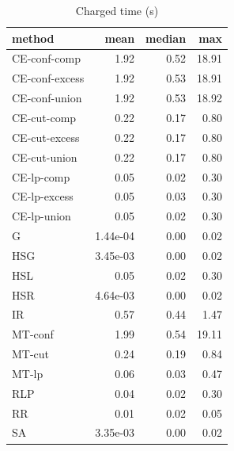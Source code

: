 \begin{table}[htbp]
\centering
\small
\caption{Charged time (s)}
\label{tab:E2_head_to_head_time}
\begin{tabular}{lrrr}
\toprule
method & mean & median & max \\
\midrule
CE-conf-comp & 1.92 & 0.52 & 18.91 \\
CE-conf-excess & 1.92 & 0.53 & 18.91 \\
CE-conf-union & 1.92 & 0.53 & 18.92 \\
CE-cut-comp & 0.22 & 0.17 & 0.80 \\
CE-cut-excess & 0.22 & 0.17 & 0.80 \\
CE-cut-union & 0.22 & 0.17 & 0.80 \\
CE-lp-comp & 0.05 & 0.02 & 0.30 \\
CE-lp-excess & 0.05 & 0.03 & 0.30 \\
CE-lp-union & 0.05 & 0.02 & 0.30 \\
G & 1.44e-04 & 0.00 & 0.02 \\
HSG & 3.45e-03 & 0.00 & 0.02 \\
HSL & 0.05 & 0.02 & 0.30 \\
HSR & 4.64e-03 & 0.00 & 0.02 \\
IR & 0.57 & 0.44 & 1.47 \\
MT-conf & 1.99 & 0.54 & 19.11 \\
MT-cut & 0.24 & 0.19 & 0.84 \\
MT-lp & 0.06 & 0.03 & 0.47 \\
RLP & 0.04 & 0.02 & 0.30 \\
RR & 0.01 & 0.02 & 0.05 \\
SA & 3.35e-03 & 0.00 & 0.02 \\
\bottomrule
\end{tabular}
\end{table}
